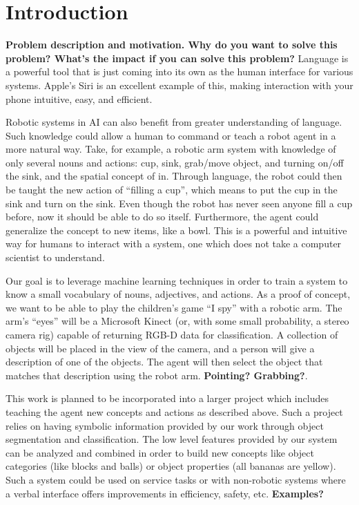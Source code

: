 \documentclass[11pt]{article}
\title{\xxx{Linguistic Classification of Objects}}
\author{Rob Goeddel \and Lauren Hinkle \and James Kirk \and Aaron Mininger}
\date{}
\newcommand{\xxx}[1]{{\bf \color{red} #1}}
\newcommand{\meh}[1]{{\bf \color{blue} #1}}
\begin{document}
\maketitle

\begin{abstract}
\xxx{Abstract goes here, 1 par. max}
Dijkstra was a cool guy and it's fun to cite his papers~\cite{dijkstra1959}. (It's true)
\end{abstract}

\section{Introduction}
\xxx{Problem description and motivation. Why do you want to solve this
    problem? What's the impact if you can solve this problem?}
Language is a powerful tool that is just coming into its own as the human
interface for various systems. Apple's Siri is an excellent example of this,
making interaction with your phone intuitive, easy, and efficient.

Robotic systems in AI can also benefit from greater understanding of
language. Such knowledge could allow a human to command or teach a robot agent in a more natural way. Take, for example, a robotic arm system with knowledge of only
several nouns and actions: cup, sink, grab/move object, and turning on/off
the sink, and the spatial concept of in. Through language, the robot could then be taught the new action of ``filling a cup'', which means to put the cup in the sink and turn on the
sink. Even though the robot has never seen anyone fill a cup before, now
it should be able to do so itself. Furthermore, the agent could generalize the concept to new items, like a bowl. This is a powerful
and intuitive way for humans to interact with a system, one which does not
take a computer scientist to understand.

Our goal is to leverage machine learning techniques in order to train a system to know a small vocabulary of nouns, adjectives,
and actions. As a proof of concept, we want to be able to play the children's
game ``I spy'' with a robotic arm. The arm's ``eyes'' will be a Microsoft
Kinect (or, with some small probability, a stereo camera rig) capable of
returning RGB-D data for classification. A collection of objects will be placed in the view of the camera, and a person will give a description of one of the objects. The agent will then select the object that matches that description using the robot arm. \meh{Pointing? Grabbing?}.

This work is planned to be incorporated into a larger project which includes teaching the agent new concepts and actions as described above. Such a project relies on having symbolic information provided by our work through object segmentation and classification. The low level features provided by our system can be analyzed and combined in order to build new concepts like object categories (like blocks and balls) or object properties (all bananas are yellow). Such a system could be used on service tasks or with non-robotic systems where a verbal interface
offers improvements in efficiency, safety, etc. \xxx{Examples?}
\end{document}
